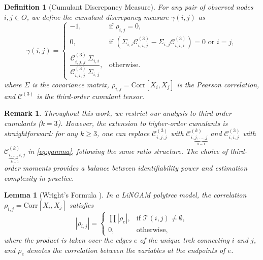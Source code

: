 \documentclass[11pt,a4paper]{article}
\numberwithin{equation}{section}
\newtheorem{definition}[theorem]{Definition}
\newtheorem{lemma}[theorem]{Lemma}
\newtheorem{remark}[theorem]{Remark}
\begin{document}
\begin{definition}[Cumulant Discrepancy Measure]
\label{def:discrepancy}
 For any pair of observed nodes $i, j \in O$, we define the cumulant discrepancy measure $\gamma(i,j)$ as
\begin{equation}\label{eq:gamma}
\gamma(i,j) =
\begin{cases}
-1, & \text{if } \rho_{i,j} = 0, \\[0.5ex]
0, & \text{if } (\Sigma_{i,i} \mathcal{C}^{(3)}_{i,i,j} - \Sigma_{i,j} \mathcal{C}^{(3)}_{i,i,i}) = 0 \text{ or } i = j, \\[0.5ex]
\dfrac{\mathcal{C}^{(3)}_{i,j,j} \, \Sigma_{i,i}}{\mathcal{C}^{(3)}_{i,i,j} \, \Sigma_{i,j}}, & \text{otherwise}.
\end{cases}
\end{equation}
\noindent
where $\Sigma$ is the covariance matrix, $\rho_{i,j} = \text{Corr}[X_i, X_j]$ is the Pearson correlation, and $\mathcal{C}^{(3)}$ is the third-order cumulant tensor.

\end{definition}

\begin{remark}
Throughout this work, we restrict our analysis to third-order cumulants ($k=3$). However, the extension to higher-order cumulants is straightforward: for any $k \geq 3$, one can replace $\mathcal{C}^{(3)}_{i,j,j}$ with $\mathcal{C}^{(k)}_{i,\underbrace{j,\ldots,j}_{k-1}}$ and $\mathcal{C}^{(3)}_{i,i,j}$ with $\mathcal{C}^{(k)}_{\underbrace{i,\ldots,i}_{k-1},j}$ in \eqref{eq:gamma}, following the same ratio structure. The choice of third-order moments provides a balance between identifiability power and estimation complexity in practice.
\end{remark}

\begin{lemma}[Wright's Formula {\citealp{wright:1960}}]
\label{lem:wright}
In a LiNGAM polytree model, the correlation $\rho_{i,j} = \text{Corr}[X_i,X_j]$ satisfies
\begin{equation}
  |\rho_{i,j}| =
  \begin{cases}
    \prod |\rho_e|, & \text{if } \mathcal{T}(i,j) \ne \emptyset, \\[0.5ex]
    0, & \text{otherwise},
  \end{cases}
\end{equation}
where the product is taken over the edges $e$ of the unique trek connecting $i$ and $j$, and $\rho_e$ denotes the correlation between the variables at the endpoints of $e$.
\end{lemma}
\end{document}
